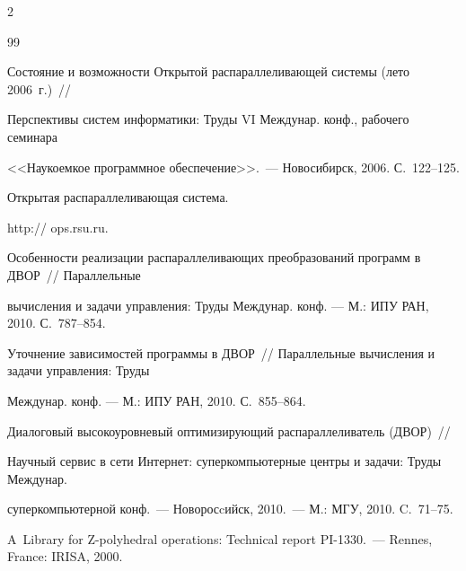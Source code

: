 \begin{multicols}{2}
{{\begin{thebibliography}{99}




  

Состояние и возможности Открытой распараллеливающей системы (лето 2006~г.)~// 

Перспективы систем информатики: Труды VI Междунар. конф., рабочего семинара 

<<Наукоемкое программное обеспечение>>.~--- Новосибирск, 2006. С.~122--125.



 Открытая распараллеливающая система.

{\sf http:// ops.rsu.ru}.



  

Особенности реализации распараллеливающих преобразований программ в ДВОР~// Параллельные 

вы\-чис\-ле\-ния и задачи управления: Труды Междунар. конф. --- М.: ИПУ РАН, 2010. С.~787--854.



  

Уточнение зависимостей программы в ДВОР~// Параллельные вычисления и задачи управления: Труды 

Междунар. конф. --- М.: ИПУ РАН, 2010. С.~855--864.



  

Диалоговый высокоуровневый оптимизирующий распараллеливатель (ДВОР)~// 

Научный сервис в сети Интернет: суперкомпьютерные центры и задачи: Труды Междунар. 

суперкомпьютерной конф.~--- Новоросcийск, 2010.~--- М.: МГУ, 2010. C.~71--75.



\label{end\stat}



  

A~Library for Z-polyhedral operations: Technical report PI-1330.~--- Rennes, France: IRISA, 2000.

\end{thebibliography}

}

}



\end{multicols}

